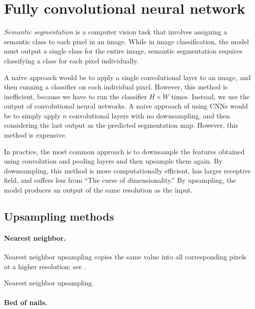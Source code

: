 \section{Fully convolutional neural network}

\textit{Semantic segmentation} is a computer vision task that involves assigning a semantic class to
each pixel in an image. While in image classification, the model must output a single class for the
entire image, semantic segmentation requires classifying a class for each pixel individually.

A naive approach would be to apply a single convolutional layer to an image, and then running a
classifier on each individual pixel. However, this method is inefficient, because we have to run
the classifier $H\times W$ times. Instead, we use the output of convolutional neural networks. A
naive approach of using CNNs would be to simply apply $n$ convolutional layers with no
downsampling, and then considering the last output as the predicted segmentation map. However, this
method is expensive.

In practice, the most common approach is to downsample the features obtained using convolution and
pooling layers and then upsample them again. By downsampling, this method is more computationally
efficient, has larger receptive field, and suffers less from ``The curse of dimensionality.'' By
upsampling, the model produces an output of the same resolution as the input.

\subsection{Upsampling methods}

\paragraph{Nearest neighbor.}

Nearest neighbor upsampling copies the same value into all corresponding pixels at a higher
resolution; see .

\begin{marginfigure}
    \centering
    \caption{Nearest neighbor upsampling.}
    \label{fig:nearest-neighbor-upsampling}
\end{marginfigure}

\paragraph{Bed of nails.}

